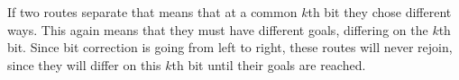 If two routes separate that means that at a common $k$th bit they chose different ways. This again means that they must have different goals, differing on the $k$th bit. Since bit correction is going from left to right, these routes will never rejoin, since they will differ on this $k$th bit until their goals are reached.
